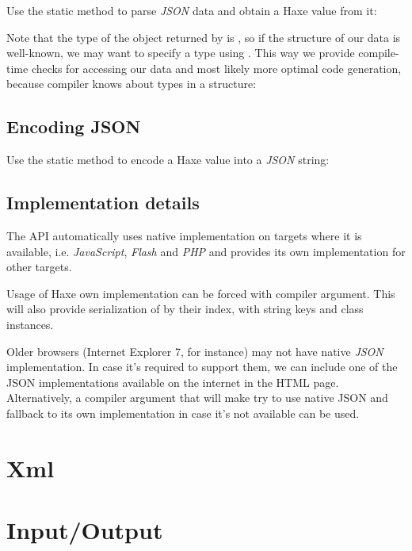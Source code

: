 Use the  static method to parse \emph{JSON} data and obtain a Haxe value from it:

Note that the type of the object returned by  is , so if the structure of our data is well-known, we may want to specify a type using . This way we provide compile-time checks for accessing our data and most likely more optimal code generation, because compiler knows about types in a structure:

\subsection{Encoding JSON}
\label{std-Json-encoding}

Use the  static method to encode a Haxe value into a \emph{JSON} string:

\subsection{Implementation details}
\label{std-Json-implementation-details}

The  API automatically uses native implementation on targets where it is available, i.e. \emph{JavaScript}, \emph{Flash} and \emph{PHP} and provides its own implementation for other targets.

Usage of Haxe own implementation can be forced with  compiler argument. This will also provide serialization of  by their index,  with string keys and class instances.

Older browsers (Internet Explorer 7, for instance) may not have native \emph{JSON} implementation. In case it's required to support them, we can include one of the JSON implementations available on the internet in the HTML page. Alternatively, a  compiler argument that will make  try to use native JSON and fallback to its own implementation in case it's not available can be used.

\section{Xml}
\label{std-Xml}

\section{Input/Output}
\label{std-input-output}

